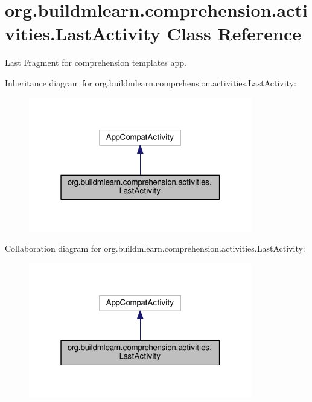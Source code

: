 \hypertarget{classorg_1_1buildmlearn_1_1comprehension_1_1activities_1_1LastActivity}{}\section{org.\+buildmlearn.\+comprehension.\+activities.\+Last\+Activity Class Reference}
\label{classorg_1_1buildmlearn_1_1comprehension_1_1activities_1_1LastActivity}


Last Fragment for comprehension template\textquotesingle{}s app.  




Inheritance diagram for org.\+buildmlearn.\+comprehension.\+activities.\+Last\+Activity\+:
\nopagebreak
\begin{figure}[H]
\begin{center}
\leavevmode
\includegraphics[width=277pt]{classorg_1_1buildmlearn_1_1comprehension_1_1activities_1_1LastActivity__inherit__graph}
\end{center}
\end{figure}


Collaboration diagram for org.\+buildmlearn.\+comprehension.\+activities.\+Last\+Activity\+:
\nopagebreak
\begin{figure}[H]
\begin{center}
\leavevmode
\includegraphics[width=277pt]{classorg_1_1buildmlearn_1_1comprehension_1_1activities_1_1LastActivity__coll__graph}
\end{center}
\end{figure}

